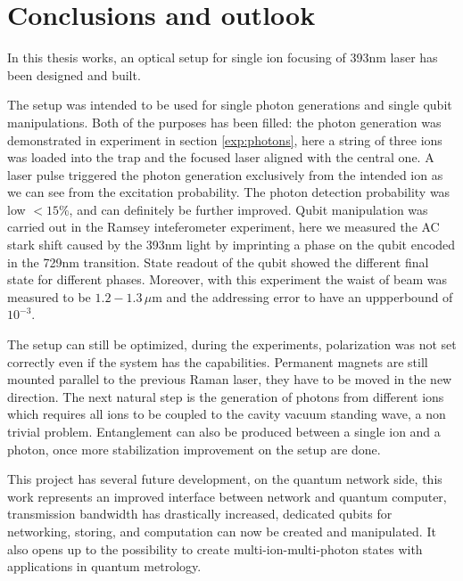 
\chapter{Conclusions and outlook}
In this thesis works, an optical setup for single ion focusing of 393nm laser has been designed and built.

The setup was intended to be used for single photon generations and single qubit manipulations. Both of the purposes has been filled: the photon generation was demonstrated in
experiment in section \ref{exp:photons}, here a string of three ions was loaded into the trap and the focused laser aligned with the central one. A laser pulse triggered the photon generation exclusively from the intended ion as we can see from the excitation probability. The photon detection probability was low $<15\%$, and can definitely be further improved. Qubit manipulation was carried out in the Ramsey inteferometer experiment, here we measured the AC stark shift caused by the 393nm light by imprinting a phase on the qubit encoded in the 729nm transition. State readout of the qubit showed the different final state for different phases. Moreover, with this experiment the waist of beam was measured to be $1.2-1.3\,\mu$m and the addressing error to have an uppperbound of $10^{-3}$.

The setup can still be optimized, during the experiments, polarization was not set correctly even if the system has the capabilities. Permanent magnets are still mounted parallel to the previous Raman laser, they have to be moved in the new direction. The next natural step is the generation of photons from different ions which requires all ions to be coupled to the cavity vacuum standing wave, a non trivial problem. Entanglement can also be produced between a single ion and a photon, once more stabilization improvement on the setup are done.


This project has several future development, on the quantum network side, this work represents an improved interface between network and quantum computer, transmission bandwidth has drastically increased, dedicated qubits for networking, storing, and computation can now be created and manipulated. It also opens up to the possibility to create multi-ion-multi-photon states with applications in quantum metrology.
